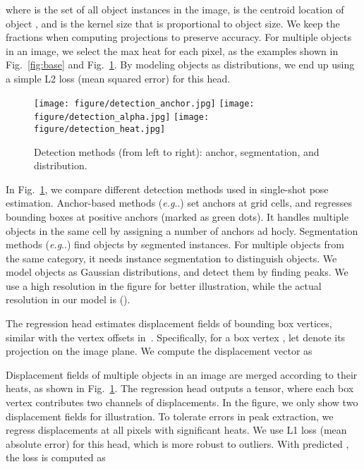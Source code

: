 \documentclass[runningheads]{llncs}
\makeatletter
\DeclareRobustCommand\onedot{\futurelet\@let@token\@onedot}
\def\@onedot{\ifx\@let@token.\else.\null\fi\xspace}
\def\eg{\emph{e.g}\onedot} \def\Eg{\emph{E.g}\onedot}
\makeatother
\begin{document}
where  is the set of all object instances in the image,  is the centroid location of object , and  is the kernel size that is proportional to object size. We keep the fractions when computing projections  to preserve accuracy. For multiple objects in an image, we select the max heat for each pixel, as the examples shown in Fig.~\ref{fig:base} and Fig.~\ref{fig:detection}. By modeling objects as distributions, we end up using a simple L2 loss (mean squared error) for this head.

\begin{figure}[t]
    \centering
    \texttt{[image: figure/detection\_anchor.jpg]}\hspace{5pt}
    \texttt{[image: figure/detection\_alpha.jpg]}\hspace{5pt}
    \texttt{[image: figure/detection\_heat.jpg]}
    \caption{Detection methods (from left to right): anchor, segmentation, and distribution.}
    \label{fig:detection}
\end{figure}

In Fig.~\ref{fig:detection}, we compare different detection methods used in single-shot pose estimation. Anchor-based methods (\eg \cite{Tekin_2018_SingleShot}) set anchors at grid cells, and regresses bounding boxes at positive anchors (marked as green dots). It handles multiple objects in the same cell by assigning a number of anchors ad hocly. Segmentation methods (\eg \cite{Hu_2019_Segmentation}) find objects by segmented instances. For multiple objects from the same category, it needs instance segmentation to distinguish objects. We model objects as Gaussian distributions, and detect them by finding peaks. We use a high resolution in the figure for better illustration, while the actual resolution in our model is ().

The regression head estimates displacement fields of bounding box vertices, similar with the vertex offsets in~\cite{Hu_2019_Segmentation}. Specifically, for a box vertex , let  denote its projection on the image plane. We compute the displacement vector as

Displacement fields of multiple objects in an image are merged according to their heats, as shown in Fig.~\ref{fig:detection}. The regression head outputs a  tensor, where each box vertex contributes two channels of displacements. In the figure, we only show two displacement fields for illustration. To tolerate errors in peak extraction, we regress displacements at all pixels with significant heats. We use L1 loss (mean absolute error) for this head, which is more robust to outliers. With predicted , the loss is computed as
\end{document}
